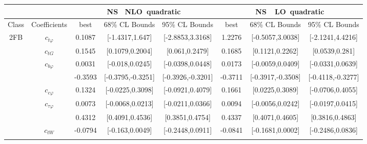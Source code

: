\documentclass{article}
\begin{document}
\begin{table}[H]
\centering
\begin{tabular}{|c|c|c|c|c|c|c|c|}
\hline
 &  & \multicolumn{3}{c|}{\rm NS \ NLO\ quadratic} & \multicolumn{3}{c|}{\rm NS\ \ LO\ quadratic} \\ \hline
Class & Coefficients & best & 68\% CL Bounds & 95\% CL Bounds & best & 68\% CL Bounds & 95\% CL Bounds\\ \hline
\multirow{23}{*}{2FB}
 & $c_{t \varphi}$ & 0.1087                             & [-1.4317,1.647]                                 & [-2.8853,3.3168] & 1.2276                             & [-0.5057,3.0038]                                 & [-2.1241,4.4216] \\ \cline{2-8}
 & $c_{tG}$ & 0.1545                             & [0.1079,0.2004]                                 & [0.061,0.2479] & 0.1685                             & [0.1121,0.2262]                                 & [0.0539,0.281] \\ \cline{2-8}
 & $c_{b \varphi}$ & 0.0031                             & [-0.018,0.0245]                                 & [-0.0398,0.0448] & 0.0173                             & [-0.0059,0.0409]                                 & [-0.0331,0.0639] \\ \cline{3-8} & & -0.3593                                 & [-0.3795,-0.3251]                                     & [-0.3926,-0.3201] & -0.3711                                 & [-0.3917,-0.3508]                                     & [-0.4118,-0.3277] \\ \cline{2-8}
 & $c_{c \varphi}$ & 0.1324                             & [-0.0225,0.3098]                                 & [-0.0921,0.4079] & 0.1661                             & [0.0225,0.3089]                                 & [-0.0706,0.4055] \\ \cline{2-8}
 & $c_{\tau \varphi}$ & 0.0073                             & [-0.0068,0.0213]                                 & [-0.0211,0.0366] & 0.0094                             & [-0.0056,0.0242]                                 & [-0.0197,0.0415] \\ \cline{3-8} & & 0.4312                                 & [0.4091,0.4536]                                     & [0.3851,0.4754] & 0.4337                                 & [0.4071,0.4605]                                     & [0.3816,0.4863] \\ \cline{2-8}
 & $c_{tW}$ & -0.0794                             & [-0.163,0.0049]                                 & [-0.2448,0.0911] & -0.0841                             & [-0.1681,0.0002]                                 & [-0.2486,0.0836] \\ \cline{2-8}

\end{tabular}
\end{table}
\end{document}
